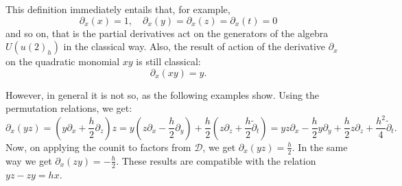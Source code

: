 \documentclass[10pt,a4paper]{amsart}
\newcommand{\pa}{\partial}
\newcommand{\DD}{\mathcal{D}}
\newcommand{\tpa}{\widetilde{\pa}}
\numberwithin{equation}{section}
\begin{document}
This definition immediately entails that, for example,
\[
\pa_x(x)=1, \quad \pa_x(y)= \pa_x(z)=\pa_x(t) = 0
\]
and so on, that is the partial derivatives act on the generators of the algebra $U(u(2)_h)$ in the classical way.
Also, the result of action of the derivative $\pa_x$ on the quadratic monomial $xy$ is still classical:
\[ \pa_x(xy)= y.\]

However, in general it is not so, as the following examples show. Using the permutation relations, we get:
\[
\pa_x (yz)=(y\pa_x+\frac{h}{2}\pa_z)z=y(z\pa_x-\frac{h}{2}\pa_y)+\frac{h}{2}(z\pa_z+\frac{h}{2}\tpa_t)=
yz\pa_x-\frac{h}{2}y\pa_y+\frac{h}{2}z\pa_z+\frac{h^2}{4}\tpa_t.
\]
Now, on applying the counit to factors from $\DD$, we get $\pa_x (yz)=\frac{h}{2}$.
In the same way we get $\pa_x (zy)=-\frac{h}{2}$. These results are compatible with the relation  $yz-zy=hx$.
\end{document}

